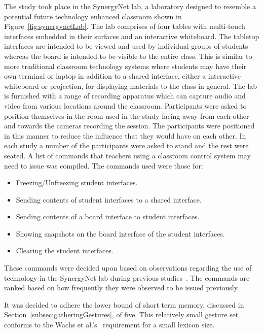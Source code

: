 \documentclass[link]{IWCOMP}
\begin{document}
The study took place in the SynergyNet lab, a laboratory designed to resemble a potential future technology enhanced classroom shown in Figure~\ref{fig:synergynetLab}.
The lab comprises of four tables with multi-touch interfaces embedded in their surfaces and an interactive whiteboard. 
The tabletop interfaces are intended to be viewed and used by individual groups of students whereas the board is intended to be visible to the entire class.
This is similar to more traditional classroom technology systems where students may have their own terminal or laptop in addition to a shared interface, either a interactive whiteboard or projection, for displaying materials to the class in general.
The lab is furnished with a range of recording apparatus which can capture audio and video from various locations around the classroom.
Participants were asked to position themselves in the room used in the study facing away from each other and towards the cameras recording the session.
The participants were positioned in this manner to reduce the influence that they would have on each other.
In each study a number of the participants were asked to stand and the rest were seated.
A list of commands that teachers using a classroom control system may need to issue was compiled.
The commands used were those for: 
\begin{itemize}
\item Freezing/Unfreezing student interfaces.
\item Sending contents of student interfaces to a shared interface.
\item Sending contents of a board interface to student interfaces.
\item Showing snapshots on the board interface of the student interfaces.
\item Clearing the student interfaces.\\
\end{itemize}

These commands were decided upon based on observations regarding the use of technology in the SynergyNet lab during previous studies~\cite{Hatch2011}.
The commands are ranked based on how frequently they were observed to be issued previously.

It was decided to adhere the lower bound of short term memory, discussed in Section~\ref{subsec:gatheringGestures}, of five.
This relatively small gesture set conforms to the Wachs et al.'s~\citeyearpar{Wachs2011} requirement for a small lexicon size.
\end{document}

